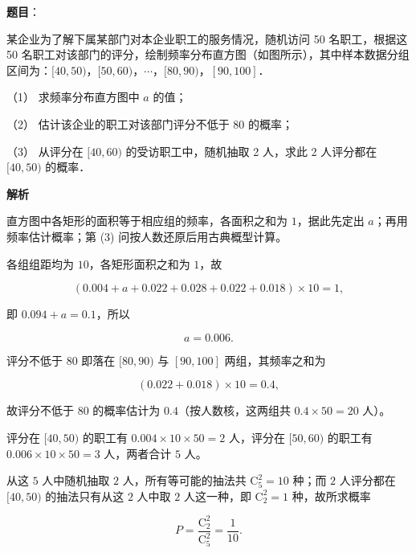 \begin{answer}

\textbf{题目}：

某企业为了解下属某部门对本企业职工的服务情况，随机访问 50 名职工，根据这 50 名职工对该部门的评分，绘制频率分布直方图（如图所示），其中样本数据分组区间为：\([40,50)\)，\([50,60)\)，\(\cdots\)，\([80,90)\)，\([90,100]\)．
\nopagebreak[4]
\begin{center}\end{center}
\nopagebreak[4]
（1） 求频率分布直方图中 \(a\) 的值；

（2） 估计该企业的职工对该部门评分不低于 80 的概率；

（3） 从评分在 \([40,60)\) 的受访职工中，随机抽取 2 人，求此 2 人评分都在 \([40,50)\) 的概率．

\textbf{解析}

直方图中各矩形的面积等于相应组的频率，各面积之和为 \(1\)，据此先定出 \(a\)；再用频率估计概率；第 (3) 问按人数还原后用古典概型计算。


各组组距均为 \(10\)，各矩形面积之和为 \(1\)，故

\nopagebreak[4]
\[
(0.004+a+0.022+0.028+0.022+0.018)\times10=1,
\]

即 \(0.094+a=0.1\)，所以

\nopagebreak[4]
\[
a=0.006 .
\]


评分不低于 80 即落在 \([80,90)\) 与 \([90,100]\) 两组，其频率之和为

\nopagebreak[4]
\[
(0.022+0.018)\times10=0.4 ,
\]

故评分不低于 80 的概率估计为 \(0.4\)（按人数核，这两组共 \(0.4\times50=20\) 人）。


评分在 \([40,50)\) 的职工有 \(0.004\times10\times50=2\) 人，评分在 \([50,60)\) 的职工有 \(0.006\times10\times50=3\) 人，两者合计 \(5\) 人。

从这 \(5\) 人中随机抽取 \(2\) 人，所有等可能的抽法共 \(\mathrm{C}_5^2=10\) 种；而 \(2\) 人评分都在 \([40,50)\) 的抽法只有从这 \(2\) 人中取 \(2\) 人这一种，即 \(\mathrm{C}_2^2=1\) 种，故所求概率

\nopagebreak[4]
\[
P=\dfrac{\mathrm{C}_2^2}{\mathrm{C}_5^2}=\dfrac{1}{10}.
\]


\end{answer}
